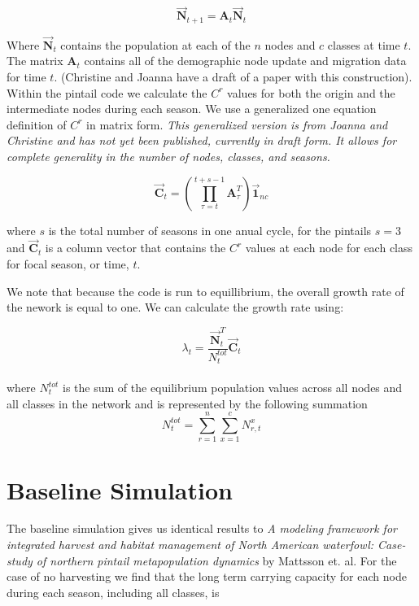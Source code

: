 \documentclass[10pt]{article}
\begin{document}
\begin{equation}
\vec{\mathbf{N}}_{t+1}={\mathbf{A}_t}\vec{\mathbf{N}}_t
\end{equation}

Where $\vec{\mathbf{N}}_{t}$ contains the population at each of the $n$ nodes and $c$ classes at time $t$. The matrix $\mathbf{A}_t$ contains all of the demographic node update and migration data for time $t$. (Christine and Joanna have a draft of a paper with this construction).\\


Within the pintail code we calculate the $C^r$ values for both the origin and the intermediate nodes during each season. We use a generalized one equation definition of $C^r$ in matrix form. {\it{This generalized version is from Joanna and Christine and has not yet been published, currently in draft form. It allows for complete generality in the number of nodes, classes, and seasons.}}

\begin{equation}
\vec{\mathbf{C}}_t=\left(\prod_{\tau=t}^{t+s-1}\mathbf{A}_\tau^T\right)\vec{\mathbf{1}}_{nc}
\end{equation}

where $s$ is the total number of seasons in one anual cycle, for the pintails $s=3$ and $\vec{\mathbf{C}}_t$ is a column vector that contains the $C^r$ values at each node for each class for focal season, or time, $t$. 

We note that because the code is run to equillibrium, the overall growth rate of the nework is equal to one. We can calculate the growth rate using:

\begin{equation}
\lambda_t= \frac{\vec{\mathbf{N}}_t^T}{N_t^{tot}}\vec{\mathbf{C}}_t
\label{lambda}
\end{equation}\\
where $N_t^{tot}$ is the sum of the equilibrium population values across all nodes and all classes in the network and is represented by the following summation
\begin{equation}
N_t^{tot}=\sum_{r=1}^n\sum_{x=1}^{c}N^x_{r,t}
\end{equation}

\section{Baseline Simulation}
% 
The baseline simulation gives us identical results to {\it{A modeling framework for integrated harvest and habitat management of North American waterfowl: Case-study of northern pintail metapopulation dynamics}} by Mattsson et. al. For the case of no harvesting we find that the long term carrying capacity for each node during each season, including all classes, is
\end{document}
